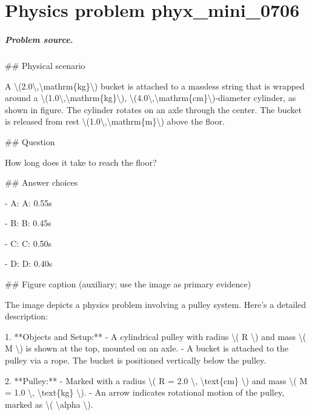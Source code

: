 
\chapter{Physics problem phyx\_mini\_0706}
\label{ch:PhyXMiniProblems_problem_phyx_mini_0706}

\paragraph{Problem source.}
\#\# Physical scenario

A \textbackslash{}(2.0\textbackslash{},\textbackslash{}mathrm\{kg\}\textbackslash{}) bucket is attached to a massless string that is wrapped around a \textbackslash{}(1.0\textbackslash{},\textbackslash{}mathrm\{kg\}\textbackslash{}), \textbackslash{}(4.0\textbackslash{},\textbackslash{}mathrm\{cm\}\textbackslash{})-diameter cylinder, as shown in figure. The cylinder rotates on an axle through the center. The bucket is released from rest \textbackslash{}(1.0\textbackslash{},\textbackslash{}mathrm\{m\}\textbackslash{}) above the floor.

\#\# Question

How long does it take to reach the floor?

\#\# Answer choices

- A: A: 0.55s

- B: B: 0.45s

- C: C: 0.50s

- D: D: 0.40s

\#\# Figure caption (auxiliary; use the image as primary evidence)

The image depicts a physics problem involving a pulley system. Here's a detailed description:

1. **Objects and Setup:**
   - A cylindrical pulley with radius \textbackslash{}( R \textbackslash{}) and mass \textbackslash{}( M \textbackslash{}) is shown at the top, mounted on an axle.
   - A bucket is attached to the pulley via a rope. The bucket is positioned vertically below the pulley.

2. **Pulley:**
   - Marked with a radius \textbackslash{}( R = 2.0 \textbackslash{}, \textbackslash{}text\{cm\} \textbackslash{}) and mass \textbackslash{}( M = 1.0 \textbackslash{}, \textbackslash{}text\{kg\} \textbackslash{}).
   - An arrow indicates rotational motion of the pulley, marked as \textbackslash{}( \textbackslash{}alpha \textbackslash{}).

